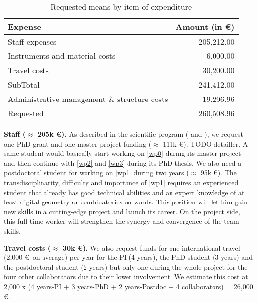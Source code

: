 \begin{table}[htbp]
  \caption{Requested means by item of expenditure}
  \centering
  \begin{tabular}{|l|r|}
    \hline 
    Expense                                      & Amount (in \euro) \\ \hline \hline
    Staff expenses                               & 205,212.00 \\ \hline
    Instruments and material costs               & 6,000.00  \\ \hline
    Travel costs                                 & 30,200.00  \\  \hline
    SubTotal                                     & 241,412.00 \\ \hline \hline
    Administrative management \& structure costs & 19,296.96 \\ \hline \hline
    Requested                                    & 260,508.96 \\ \hline
    \hline
  \end{tabular}
  \label{tab:grant}
\end{table}

\textbf{Staff ($\approx$ 205k \euro).} As described in the scientific program ( and ),
we request one PhD grant and one master project funding ($\approx$ 111k \euro). TODO detailler.
A same student would basically start working on \ref{wp0} during its master project and then
continue with \ref{wp2} and \ref{wp3} during its PhD thesis.
We also need a postdoctoral student for working on \ref{wp1} during two years ($\approx$ 95k \euro). 
The transdisciplinarity, difficulty and importance of \ref{wp1} requires an experienced student
that already has good technical abilities and an expert knowledge of at least digital geometry
or combinatorics on words. This position will let him gain new skills in a cutting-edge project
and launch its career. On the project side, this full-time worker will strengthen the synergy and
convergence of the team skills. 

\textbf{Travel costs ($\approx$ 30k \euro).}
We also request funds for one international travel (2,000 \euro~on average)
per year for the PI (4 years), the PhD student (3 years) and the postdoctoral student (2 years)
but only one during the whole project for the four other collaborators due to their lower involvement.
We estimate this cost at 2,000 x (4 years-PI + 3 years-PhD + 2 years-Postdoc + 4 collaborators) = 26,000 \euro. 

